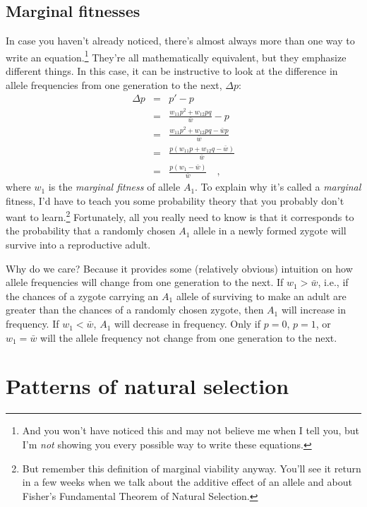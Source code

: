 \documentclass[12pt]{article}
\begin{document}
\subsection*{Marginal fitnesses}

In case you haven't already noticed, there's almost always more than
one way to write an equation.\footnote{And you won't have noticed this
  and may not believe me when I tell you, but I'm {\it not\/} showing
  you every possible way to write these equations.} They're all
mathematically equivalent, but they emphasize different things. In
this case, it can be instructive to look at the difference in allele
frequencies from one generation to the next, $\Delta p$:
\begin{eqnarray*}
\Delta p &=& p' - p \\
&=& \frac{w_{11}p^2 + w_{12}pq}{\bar w} - p \\
&=& \frac{w_{11}p^2 + w_{12}pq - \bar wp}{\bar w} \\
&=& \frac{p(w_{11}p + w_{12}q - \bar w)}{\bar w} \\
&=& \frac{p(w_1 - \bar w)}{\bar w} \quad ,
\end{eqnarray*}
where $w_1$ is the {\it marginal fitness\/} of allele $A_1$. To
explain why it's called a {\it marginal\/} fitness, I'd have to teach
you some probability theory that you probably don't want to
learn.\footnote{But remember this definition of marginal viability
anyway. You'll see it return in a few weeks when we talk about the
additive effect of an allele and about Fisher's Fundamental Theorem of
Natural Selection.} Fortunately, all you really need to know is that
it corresponds to the probability that a randomly chosen $A_1$ allele
in a newly formed zygote will survive into a reproductive
adult.

Why do we care? Because it provides some (relatively obvious)
intuition on how allele frequencies will change from one generation to
the next. If $w_1 > \bar w$, i.e., if the chances of a zygote carrying
an $A_1$ allele of surviving to make an adult are greater than the
chances of a randomly chosen zygote, then $A_1$ will increase in
frequency. If $w_1 < \bar w$, $A_1$ will decrease in frequency. Only
if $p=0$, $p=1$, or $w_1=\bar w$ will the allele frequency not change
from one generation to the next.

\section*{Patterns of natural selection}
\end{document}
